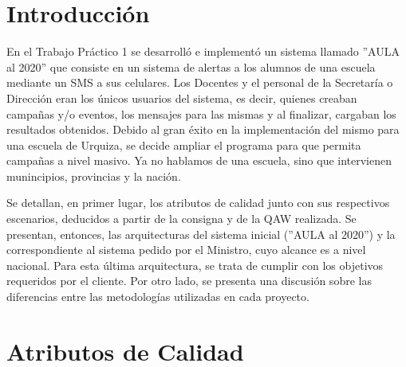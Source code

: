 \documentclass[a4paper, 11pt]{article}
\begin{document}
\pagestyle{myheadings}
\maketitle

\thispagestyle{empty}
\tableofcontents

\newpage

\section{Introducci\'on}
En el Trabajo Práctico 1 se desarrolló e implementó un sistema llamado ''AULA al 2020'' que consiste en un sistema de alertas a los alumnos de una escuela mediante un SMS a sus celulares. Los Docentes y el personal de la Secretaría o Dirección eran los únicos usuarios del sistema, es decir, quienes creaban campa\~nas y/o eventos, los mensajes para las mismas y al finalizar, cargaban los resultados obtenidos. Debido al gran éxito en la implementación del mismo para una escuela de Urquiza, se decide ampliar el programa para que permita campa\~nas a nivel masivo. Ya no hablamos de una escuela, sino que intervienen munincipios, provincias y la nación. 

Se detallan, en primer lugar, los atributos de calidad junto con sus respectivos escenarios, deducidos a partir de la consigna y de la QAW realizada. 
Se presentan, entonces, las arquitecturas del sistema inicial (''AULA al 2020'') y la correspondiente al sistema pedido por el Ministro, cuyo alcance es a nivel nacional. Para esta última arquitectura, se trata de cumplir con los objetivos requeridos por el cliente. Por otro lado, se presenta una discusión sobre las diferencias entre las metodologías utilizadas en cada proyecto.


\newpage
\section{Atributos de Calidad}
\end{document}
